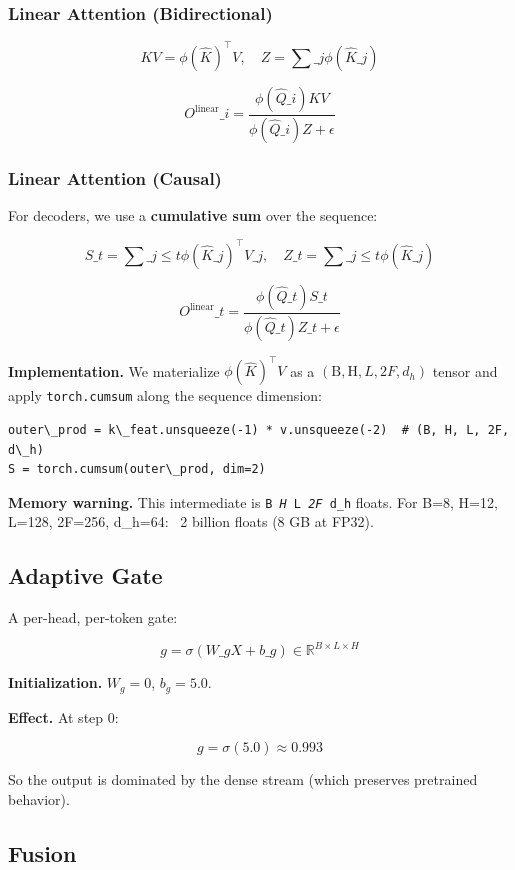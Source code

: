 \subsubsection{Linear Attention (Bidirectional)}

\[
KV = \phi(\hat{K})^\top V, \quad
Z = \sum\_j \phi(\hat{K}\_j)
\]

\[
O^\text{linear}\_i = \frac{\phi(\hat{Q}\_i) KV}{\phi(\hat{Q}\_i) Z + \epsilon}
\]

\subsubsection{Linear Attention (Causal)}

For decoders, we use a \textbf{cumulative sum} over the sequence:

\[
S\_t = \sum\_{j \leq t} \phi(\hat{K}\_j)^\top V\_j, \quad
Z\_t = \sum\_{j \leq t} \phi(\hat{K}\_j)
\]

\[
O^\text{linear}\_t = \frac{\phi(\hat{Q}\_t) S\_t}{\phi(\hat{Q}\_t) Z\_t + \epsilon}
\]

\textbf{Implementation.} We materialize $\phi(\hat{K})^\top V$ as a 
$(\text{B}, \text{H}, L, 2F, d_h)$ tensor and apply \texttt{torch.cumsum} along 
the sequence dimension:

\begin{lstlisting}
outer\_prod = k\_feat.unsqueeze(-1) * v.unsqueeze(-2)  # (B, H, L, 2F, d\_h)
S = torch.cumsum(outer\_prod, dim=2)
\end{lstlisting}

\textbf{Memory warning.} This intermediate is \texttt{B \textit{ H } L \textit{ 2F } d\_h} floats. 
For B=8, H=12, L=128, 2F=256, d\_h=64: ~2 billion floats (8 GB at FP32).

\subsection{Adaptive Gate}

A per-head, per-token gate:

\[
g = \sigma(W\_g X + b\_g) \in \mathbb{R}^{B \times L \times H}
\]

\textbf{Initialization.} $W_g = 0$, $b_g = 5.0$.

\textbf{Effect.} At step 0:

\[
g = \sigma(5.0) \approx 0.993
\]

So the output is dominated by the dense stream (which preserves pretrained 
behavior).

\subsection{Fusion}

